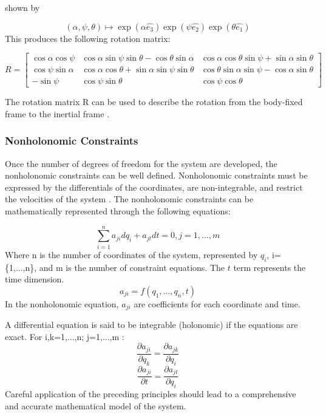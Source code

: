 shown by
\par
\begin{equation}
(\alpha, \psi, \theta) \mapsto \exp(\alpha\hat{e_3})\exp(\psi\hat{e_2})\exp(\theta\hat{e_1})
\end{equation}
This produces the following rotation matrix:

\begin{equation} R =
\begin{bmatrix} 
\cos\alpha\cos\psi & \cos\alpha\sin\psi\sin\theta - \cos\theta\sin\alpha &\cos\alpha\cos\theta\sin\psi+\sin\alpha\sin\theta\\
\cos\psi\sin\alpha & \cos\alpha\cos\theta+\sin\alpha\sin\psi\sin\theta & \cos\theta\sin\alpha\sin\psi - \cos\alpha\sin\theta\\
 -\sin\psi & \cos\psi\sin\theta & \cos\psi\cos\theta 
\end{bmatrix}
\end{equation}
\par
The rotation matrix R can be used to describe the rotation from the body-fixed frame to the inertial frame \cite{VTOL}.

\subsubsection{Nonholonomic Constraints}
Once the number of degrees of freedom for the system are developed, the nonholonomic constraints can be well defined. 
Nonholonomic constraints must be expressed by the differentials of the coordinates, are non-integrable, and restrict the velocities of the system \cite{LagrangeEquations}. 
The nonholonomic constraints can be mathematically represented through the following equations:

\begin{equation}
\sum_{i=1}^{n}a_{ji}dq_i+a_{jt}dt=0, j=1,...,m
\end{equation}
Where n is the number of coordinates of the system, represented by $q_i$, i=\{1,...,n\}, and m is the number of constraint equations. The $t$ term represents the time dimension. 
\begin{equation}
a_{ji}=f(q_1,...,q_n,t)
\end{equation}
In the nonholonomic equation, $a_{ji}$ are coefficients for each coordinate and time.

A differential equation is said to be integrable (holonomic) if the equations are exact. For i,k=1,...,n; j=1,...,m \cite{LagrangeEquations}:
\begin{equation}
\frac{\partial{a_{ji}}}{\partial{q_{k}}}= \frac{\partial{a_{jk}}}{\partial{q_{i}}}
\end{equation}
\begin{equation}
\frac{\partial{a_{ji}}}{\partial{t}}= \frac{\partial{a_{jt}}}{\partial{q_{i}}}
\end{equation}
Careful application of the preceding principles should lead to a comprehensive and accurate mathematical model of the system.
